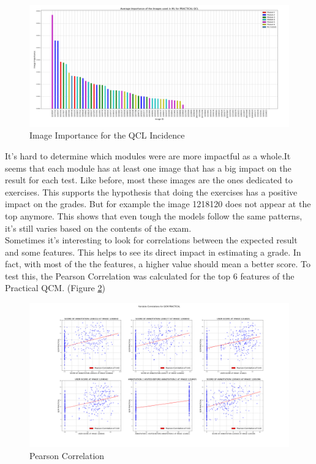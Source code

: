 \documentclass[a4paper,11pt]{report}
\numberwithin{figure}{section} %
\begin{document}
      \begin{figure}[H]
      \centering
      \includegraphics[width=.95\linewidth]{im_importance_PRACTICAL_QCL_2018-04-29_14_33_48.png}
      \caption{Image Importance for the QCL Incidence}
      \label{fig:im_tp4}
      \end{figure}

	It's hard to determine which modules were are more impactful as a whole.It seems that each module has at least one image that has a big impact on the result for each test.
	Like before, most these images are the ones dedicated to exercises.
	This supports the hypothesis that doing the exercises has a positive impact on the grades.
	But for example the image 1218120 does not appear at the top anymore.
	This shows that even tough the models follow the same patterns, it's still varies based on the contents of the exam.\\
    
    Sometimes it's interesting  to look for correlations between the expected result and some features.
    This helps to see its direct impact in estimating a grade.
    In fact, with most of the the features, a higher value should mean a better score.
    To test this, the Pearson Correlation was calculated for the top 6 features of the Practical QCM. (Figure \ref{fig:corr_tp})
      \begin{figure}[H]
      \centering
      \includegraphics[width=.95\linewidth]{var_correlation_QCM_PRACTICAL_2018-04-29_14_38_14.png}
      \caption{Pearson Correlation}
      \label{fig:corr_tp}
      \end{figure}
    
\end{document}
